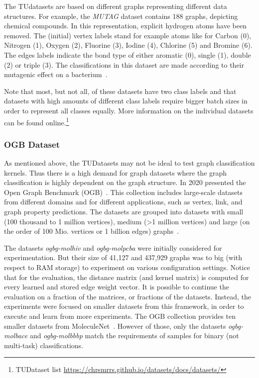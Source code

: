 			The TUdatasets are based on different graphs representing different data structures.
			For example, the \textit{MUTAG} dataset contains 188 graphs, depicting chemical compounds.
			In this representation, explicit hydrogen atoms have been removed. 
			The (initial) vertex labels stand for example atoms like for Carbon (0), Nitrogen (1), Oxygen (2), Fluorine (3), Iodine (4), Chlorine (5) and Bromine (6).
			The edges labels indicate the bond type of either aromatic (0), single (1), double (2) or triple (3).
			The classifications in this dataset are made according to their mutagenic effect on a bacterium~\cite{1991_Debnath_CONF}.

			Note that most, but not all, of these datasets have two class labels and that datasets with high amounts of different class labels require bigger batch sizes in order to represent all classes equally.
			More information on the individual datasets can be found online.\footnote{TUDataset list \url{https://chrsmrrs.github.io/datasets/docs/datasets/}}
															
		\subsubsection{OGB Dataset} \label{subsec:OGB}
			
			As mentioned above, the TUDatasets may not be ideal to test graph classification kernels.
			Thus there is a high demand for graph datasets where the graph classification is highly dependent on the graph structure.			
			In 2020 \citeauthor{2020_Hu_CONF} presented the Open Graph Benchmark (OGB)~\cite{2020_Hu_CONF}.
			This collection includes large-scale datasets from different domains and for different applications, such as vertex, link, and graph property predictions.
			The datasets are grouped into datasets with small (100 thousand to 1 million vertices), medium (>1 million vertices) and large (on the order of 100 Mio. vertices or 1 billion edges) graphs~\cite{2020_Hu_CONF}.
					
			The datasets \textit{ogbg-molhiv} and \textit{ogbg-molpcba} were initially considered for experimentation.
			But their size of 41,127 and 437,929 graphs was to big (with respect to RAM storage) to experiment on various configuration settings.
			Notice that for the evaluation, the distance matrix (and kernel matrix) is computed for every learned and stored edge weight vector.
			It is possible to continue the evaluation on a fraction of the matrices, or fractions of the datasets.
			Instead, the experiments were focused on smaller datasets from this framework, in order to execute and learn from more experiments.
			The OGB collection provides ten smaller datasets from MoleculeNet~\cite{2018_Wu_CONF}.
			However of those, only the datasets \textit{ogbg-molbace} and \textit{ogbg-molbbbp} match the requirements of samples for binary (not multi-task) classifications.
									
